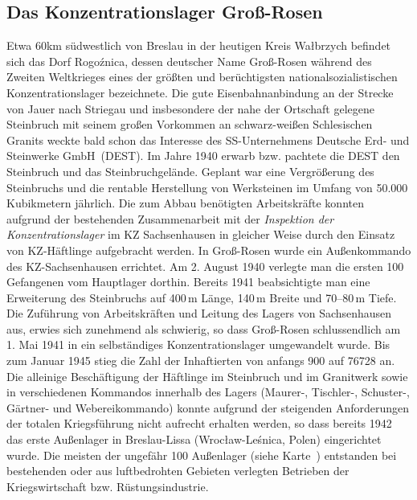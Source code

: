 



\begin{fshaded}\vspace{-.5cm}\subsection*{Das Konzentrationslager Groß-Rosen}
Etwa 60km südwestlich von Breslau in der heutigen Kreis Wa\l brzych befindet sich das Dorf Rogo\'znica, dessen deutscher Name Groß-Rosen  während des Zweiten Weltkrieges eines der größten und berüchtigsten nationalsozialistischen Konzentrationslager bezeichnete. Die gute Eisenbahnanbindung an der Strecke von Jauer nach Striegau und insbesondere der nahe der Ortschaft gelegene Steinbruch mit seinem großen Vorkommen an schwarz-weißen Schlesischen Granits weckte bald schon das Interesse des SS-Unternehmens \glqq Deutsche Erd- und Steinwerke GmbH\grqq~\-(DEST). Im Jahre 1940 erwarb bzw. pachtete die DEST den Steinbruch und das Steinbruchgelände. Geplant war eine Vergrößerung des Steinbruchs und die rentable Herstellung von Werksteinen im Umfang von 50.000 Kubikmetern jährlich. Die zum Abbau benötigten Arbeitskräfte konnten aufgrund der bestehenden Zusammenarbeit mit der \emph{Inspektion der Konzentrationslager} im KZ Sachsenhausen in gleicher Weise durch den Einsatz von KZ-Häftlinge aufgebracht werden. In Groß-Rosen wurde ein Außenkommando des KZ-Sachsenhausen errichtet. Am 2. August 1940 verlegte man die ersten 100 Gefangenen vom Hauptlager dorthin. Bereits 1941 beabsichtigte man eine Erweiterung des Steinbruchs auf 400\,m Länge, 140\,m Breite und 70--80\,m Tiefe. Die Zuführung von Arbeitskräften und Leitung des Lagers von Sachsenhausen aus, erwies sich zunehmend als schwierig, so dass Groß-Rosen schlussendlich am 1. Mai 1941 in ein selbständiges Konzentrationslager umgewandelt wurde. Bis zum Januar 1945 stieg die Zahl der Inhaftierten von anfangs 900 auf 76728 an. Die alleinige Beschäftigung der Häftlinge im Steinbruch und im Granitwerk sowie in verschiedenen Kommandos innerhalb des Lagers (Maurer-, Tischler-, Schuster-, Gärtner- und Webereikommando) konnte aufgrund der steigenden Anforderungen der totalen Kriegsführung nicht aufrecht erhalten werden, so dass bereits 1942 das erste Außenlager in Breslau-Lissa (Wroc\l aw-Leśnica, Polen) eingerichtet wurde. Die meisten der ungefähr 100 Außenlager (siehe Karte~) entstanden bei bestehenden oder aus luftbedrohten Gebieten verlegten Betrieben der Kriegswirtschaft bzw. Rüstungsindustrie.

\end{fshaded}
